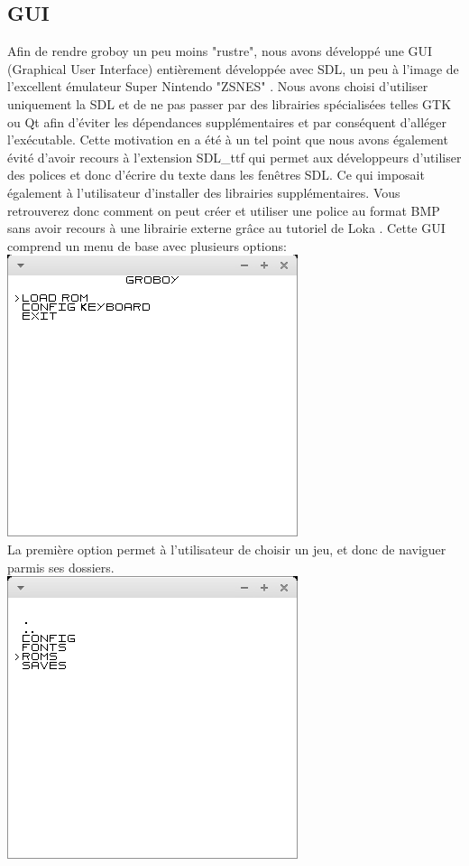 \documentclass{report}
\begin{document}
\subsection{GUI}
Afin de rendre groboy un peu moins "rustre", nous avons développé une GUI (Graphical User Interface) entièrement développée avec SDL, un peu à l'image de l'excellent émulateur Super Nintendo "ZSNES" \cite{zsnes}. Nous avons choisi d'utiliser uniquement la SDL et de ne pas passer par des librairies spécialisées telles GTK ou Qt afin d'éviter les dépendances supplémentaires et par conséquent d'alléger l'exécutable. Cette motivation en a été à un tel point que nous avons également évité d'avoir recours à l'extension SDL\_ttf qui permet aux développeurs d'utiliser des polices et donc d'écrire du texte dans les fenêtres SDL. Ce qui imposait également à l'utilisateur d'installer des librairies supplémentaires. Vous retrouverez donc comment on peut créer et utiliser une police au format BMP sans avoir recours à une librairie externe grâce au tutoriel de Loka \cite{loka}. Cette GUI comprend un menu de base avec plusieurs options: \\ 
\includegraphics[scale=0.5]{images/screenshot_menu.png}\\
La première option permet à l'utilisateur de choisir un jeu, et donc de naviguer parmis ses dossiers.\\
\includegraphics[scale=0.5]{images/screenshot_navigate.png}\\
\end{document}
